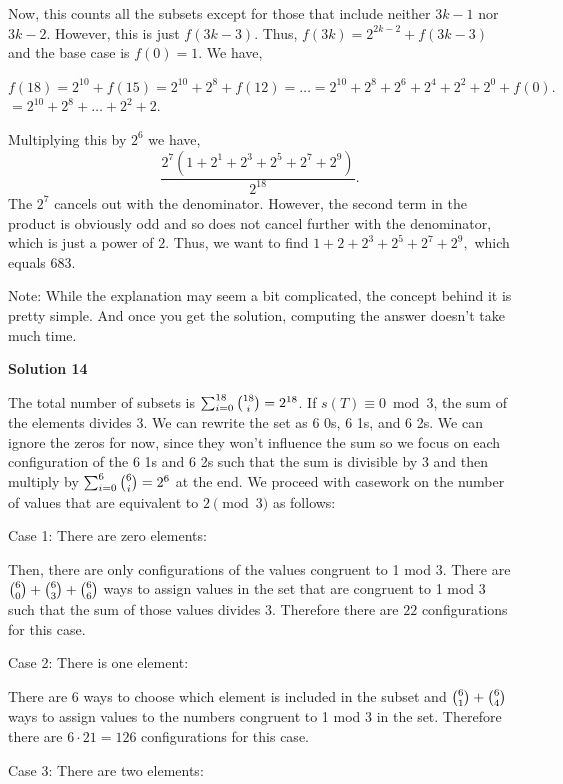 \begin{enumerate}
 Now, this counts all the subsets except for those that include neither $3k-1$ nor $3k-2.$ However, this is just $f(3k - 3).$ Thus, $f(3k) = 2^{2k-2} + f(3k-3)$ and the base case is $f(0) = 1.$ We have, 

 $f(18) = 2^{10} + f(15) = 2^{10} + 2^{8} + f(12) = \dots = 2^{10} + 2^8 + 2^6 + 2^4 + 2^2 + 2^0 + f(0).$$=2^{10} + 2^8 + \dots + 2^2 + 2.$

 Multiplying this by $2^6$ we have, 
 \[\frac{2^7(1 + 2^1 + 2^3 + 2^5 + 2^7 + 2^9)}{2^{18}} .\]The $2^7$ cancels out with the denominator. However, the second term in the product is obviously odd and so does not cancel further with the denominator, which is just a power of $2.$ Thus, we want to find $1 + 2 + 2^3 + 2^5 + 2^7 + 2^9,$ which equals $\boxed{683}.$ 

 Note: While the explanation may seem a bit complicated, the concept behind it is pretty simple. And once you get the solution, computing the answer doesn't take much time.

 


 



\textbf{Solution 14}

The total number of subsets is $\sum_{i=0}^{18}\tbinom{18}{i}=2^{18}$. If $s(T)\equiv 0\bmod{3}$, the sum of the elements divides 3. We can rewrite the set as 6 0s, 6 1s, and 6 2s. We can ignore the zeros for now, since they won't influence the sum so we focus on each configuration of the 6 1s and 6 2s such that the sum is divisible by 3 and then multiply by $\sum_{i=0}^{6}\tbinom{6}{i}=2^6$ at the end. We proceed with casework on the number of values that are equivalent to $2\pmod{3}$ as follows:

 Case 1: There are zero elements:

 Then, there are only configurations of the values congruent to 1 mod 3. There are $\tbinom{6}{0}+\tbinom{6}{3}+\tbinom{6}{6}$ ways to assign values in the set that are congruent to 1 mod 3 such that the sum of those values divides 3. Therefore there are $22$ configurations for this case.

 Case 2: There is one element:

 There are $6$ ways to choose which element is included in the subset and $\tbinom{6}{1}+\tbinom{6}{4}$ ways to assign values to the numbers congruent to 1 mod 3 in the set. Therefore there are $6\cdot21=126$ configurations for this case.

 Case 3: There are two elements:


\end{enumerate}
